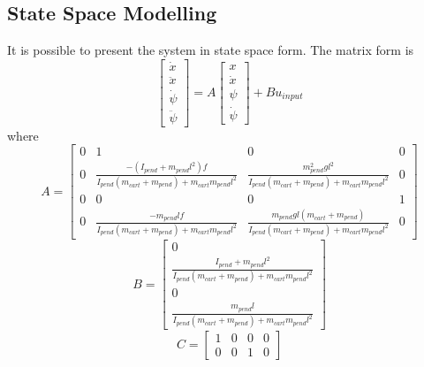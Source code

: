\begin{appendices}
\subsection{State Space Modelling}
It is possible to present the system in state space form. The matrix form is
\begin{equation}
	\begin{bmatrix}
		\dot{x} \\
		\ddot{x} \\
		\dot{\psi} \\
		\ddot{\psi}
	\end{bmatrix} = A \begin{bmatrix}
		x \\
		\dot{x} \\
		\psi \\
		\dot{\psi}
	\end{bmatrix} + B u_{input} \label{eq:state_space}
\end{equation}
where
\begin{equation}
	A = \begin{bmatrix}
		0 & 1 & 0 & 0 \\
		0 & \frac{-(I_{pend} + m_{pend} l^2) f}{I_{pend} (m_{cart} + m_{pend}) + m_{cart} m_{pend} l^2} & \frac{m_{pend}^2 g l^2}{I_{pend} (m_{cart} + m_{pend}) + m_{cart} m_{pend} l^2} & 0 \\
		0 & 0 & 0 & 1 \\
		0 & \frac{-m_{pend} l f}{I_{pend} (m_{cart} + m_{pend}) + m_{cart} m_{pend} l^2} & \frac{m_{pend} g l (m_{cart} + m_{pend})}{I_{pend} (m_{cart} + m_{pend}) + m_{cart} m_{pend} l^2} & 0
	\end{bmatrix} \label{eq:state_matrix_A}
\end{equation}
\begin{equation}
	B = \begin{bmatrix}
		0 \\
		\frac{I_{pend} + m_{pend} l^2}{I_{pend} (m_{cart} + m_{pend}) + m_{cart} m_{pend} l^2} \\
		0 \\
		\frac{m_{pend} l}{I_{pend} (m_{cart} + m_{pend}) + m_{cart} m_{pend} l^2}
	\end{bmatrix} \label{eq:state_matrix_B}
\end{equation}
\begin{equation}
	C = \begin{bmatrix}
		1 & 0 & 0 & 0 \\
		0 & 0 & 1 & 0
	\end{bmatrix} \label{eq:state_matrix_C}
\end{equation}


\end{appendices}
